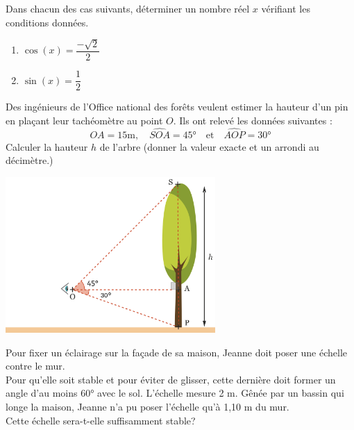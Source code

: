 \documentclass[a4paper,11pt,exos]{nsi} %
\begin{document}
\exo{}
Dans chacun des cas suivants, déterminer un nombre réel $x$ vérifiant les conditions données.
\begin{multicols}{2}
	\begin{enumerate}
		\item 	$\cos(x)=\dfrac{-\sqrt{2}}{2}$
		\item 	$\sin(x)=\dfrac{1}{2}$
	\end{enumerate}
\end{multicols}




\begin{minipage}{9cm}
	\exo{}
	Des ingénieurs de l'Office national des forêts veulent estimer la hauteur d'un pin en plaçant leur tachéomètre au point $O$. Ils ont relevé les données suivantes :
	$$OA=15 \text{m}, \quad \widehat{SOA}=45°\quad \text{et}\quad \widehat{AOP}=30°$$
	Calculer la hauteur $h$ de l'arbre (donner la valeur exacte et un arrondi au décimètre.)
\end{minipage}
\begin{minipage}{8cm}
	\flushright\includegraphics[width=8cm]{pin}
\end{minipage}



\exo{}
Pour fixer un éclairage sur la façade de sa maison, Jeanne doit poser une échelle contre le mur.\\
Pour qu'elle soit stable et pour éviter de glisser, cette dernière doit former un angle d'au moins 60° avec le sol. L'échelle mesure 2 m. Gênée par un bassin qui longe la maison, Jeanne n'a pu poser l'échelle qu'à 1,10 m du mur.\\[.5em]
Cette échelle sera-t-elle suffisamment stable?
\end{document}
